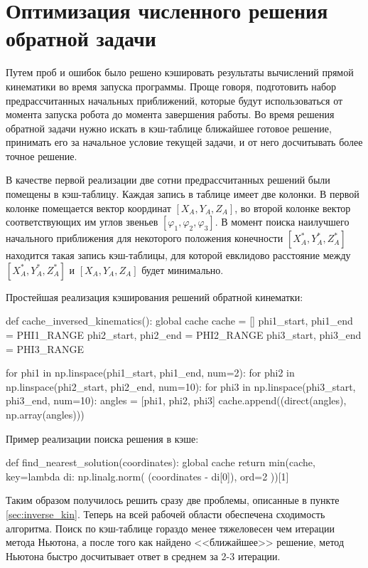 \section{Оптимизация численного решения обратной задачи}

Путем проб и ошибок было решено кэшировать результаты вычислений прямой кинематики во время запуска программы. Проще говоря, подготовить набор предрассчитанных начальных приближений, которые будут использоваться от момента запуска робота до момента завершения работы. Во время решения обратной задачи нужно искать в кэш-таблице ближайшее готовое решение, принимать его за начальное условие текущей задачи, и от него досчитывать более точное решение.

В качестве первой реализации две сотни предрассчитанных решений были помещены в кэш-таблицу. Каждая запись в таблице имеет две колонки. В первой колонке помещается вектор координат $ [X_A,Y_A,Z_A] $, во второй колонке вектор соответствующих им углов звеньев $ [\varphi_1, \varphi_2, \varphi_3] $. В момент поиска наилучшего начального приближения для некоторого положения конечности $ [X_A^*,Y_A^*,Z_A^*] $ находится такая запись кэш-таблицы, для которой евклидово расстояние между $ [X_A^*,Y_A^*,Z_A^*] $ и $ [X_A,Y_A,Z_A] $ будет минимально. 

\noindent Простейшая реализация кэширования решений обратной кинематки:

\begin{python}
def cache_inversed_kinematics():
    global cache
    cache = []
    phi1_start, phi1_end = PHI1_RANGE
    phi2_start, phi2_end = PHI2_RANGE
    phi3_start, phi3_end = PHI3_RANGE
    
    for phi1 in np.linspace(phi1_start, phi1_end, num=2):
        for phi2 in np.linspace(phi2_start, phi2_end, num=10):
            for phi3 in np.linspace(phi3_start, phi3_end, num=10):
                angles = [phi1, phi2, phi3]
                cache.append((direct(angles), np.array(angles)))
\end{python}

\noindent Пример реализации поиска решения в кэше:

\begin{python}
def find_nearest_solution(coordinates):
    global cache
    return min(cache, key=lambda di: np.linalg.norm(
        (coordinates - di[0]), 
        ord=2
    ))[1]
\end{python}

Таким образом получилось решить сразу две проблемы, описанные в пункте \ref{sec:inverse_kin}. Теперь на всей рабочей области обеспечена сходимость алгоритма. Поиск по кэш-таблице гораздо менее тяжеловесен чем итерации метода Ньютона, а после того как найдено <<ближайшее>> решение, метод Ньютона быстро досчитывает ответ в среднем за 2-3 итерации.

